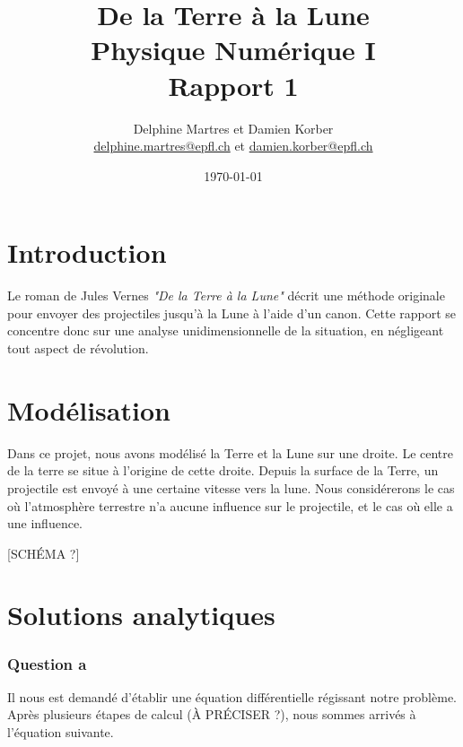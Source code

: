 \documentclass[a4paper,12pt,twoside]{article}
\newcommand{\mail}[1]{{\href{mailto:#1}{#1}}}
\begin{document}
\title{De la Terre à la Lune\\{\small Physique Numérique I}\\{\small Rapport 1}}
\date{\today}
\author{Delphine Martres et Damien Korber\\{\small \mail{delphine.martres@epfl.ch} et \mail{damien.korber@epfl.ch}}}
\maketitle
\tableofcontents %

\baselineskip=16pt
\parindent=15pt
\parskip=5pt




\section{Introduction}
Le roman de Jules Vernes \textit{"De la Terre à la Lune"} décrit une méthode originale pour envoyer des projectiles jusqu'à la Lune à l'aide d'un canon.
Cette rapport se concentre donc sur une analyse unidimensionnelle de la situation, en négligeant tout aspect de révolution.

\section{Modélisation}
Dans ce projet, nous avons modélisé la Terre et la Lune sur une droite.
Le centre de la terre se situe à l'origine de cette droite.
Depuis la surface de la Terre, un projectile est envoyé à une certaine vitesse vers la lune.
Nous considérerons le cas où l'atmosphère terrestre n'a aucune influence sur le projectile, et le cas où elle a une influence.

[SCHÉMA ?]

\section{Solutions analytiques}
\subsubsection*{Question a}
Il nous est demandé d'établir une équation différentielle régissant notre problème.
Après plusieurs étapes de calcul (À PRÉCISER ?), nous sommes arrivés à l'équation suivante.
\end{document}
